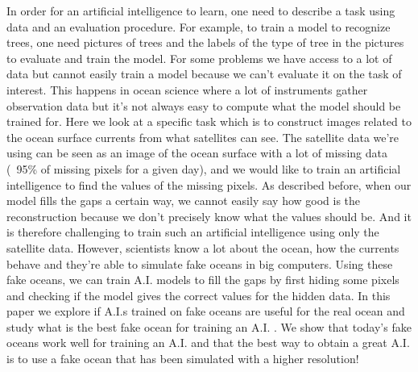 \documentclass[draft]{agujournal2019}
\begin{document}
In order for an artificial intelligence to learn, one need to describe a task using data and an evaluation procedure. For example, to train a model to recognize trees, one need pictures of trees and the labels of the type of tree in the pictures to evaluate and train the model.
For some problems we have access to a lot of data but cannot easily train a model because we can't evaluate it on the task of interest. This happens in ocean science where a lot of instruments gather observation data but it's not always easy to compute what the model should be trained for.
Here we look at a specific task which is to construct images related to the ocean surface currents from what satellites can see. The satellite data we're using can be seen as an image of the ocean surface with a lot of missing data (~95\% of missing pixels for a given day), and we would like to train an artificial intelligence to find the values of the missing pixels.
As described before, when our model fills the gaps a certain way, we cannot easily say how good is the reconstruction because we don't precisely know what the values should be. And it is therefore challenging to train such an artificial intelligence using only the satellite data.
However, scientists know a lot about the ocean, how the currents behave and they're able to simulate fake oceans in big computers. Using these fake oceans, we can train A.I. models to fill the gaps by first hiding some pixels and checking if the model gives the correct values for the hidden data.
In this paper we explore if A.I.s trained on fake oceans are useful for the real ocean and study what is the best fake ocean for training an A.I. .
We show that today's fake oceans work well for training an A.I. and that the best way to obtain a great A.I. is to use a fake ocean that has been simulated with a higher resolution!

%
%

%

\end{document}
